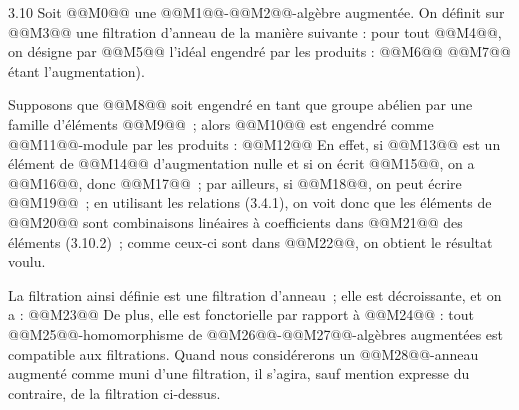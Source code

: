 
3.10
Soit @@M0@@ une @@M1@@-@@M2@@-algèbre augmentée. On définit sur @@M3@@ une filtration d'anneau de la manière suivante : pour tout @@M4@@, on désigne par @@M5@@ l'idéal engendré par les produits :
@@M6@@
@@M7@@ étant l'augmentation).

Supposons que @@M8@@ soit engendré en tant que groupe abélien par une famille d'éléments @@M9@@~; alors @@M10@@ est engendré comme @@M11@@-module par les produits :
@@M12@@
En effet, si @@M13@@ est un élément de @@M14@@ d'augmentation nulle et si on écrit @@M15@@, on a @@M16@@, donc @@M17@@~; par ailleurs, si @@M18@@, on peut écrire @@M19@@~; en utilisant les relations (3.4.1), on voit donc que les éléments de @@M20@@ sont combinaisons linéaires à coefficients dans @@M21@@ des éléments (3.10.2)~; comme ceux-ci sont dans @@M22@@, on obtient le résultat voulu.

La filtration ainsi définie est une filtration d'anneau~; elle est décroissante, et on a :
@@M23@@
De plus, elle est fonctorielle par rapport à @@M24@@ : tout @@M25@@-homomorphisme de @@M26@@-@@M27@@-algèbres augmentées est compatible aux filtrations. Quand nous considérerons un @@M28@@-anneau augmenté comme muni d'une filtration, il s'agira, sauf mention expresse du contraire, de la filtration ci-dessus.

